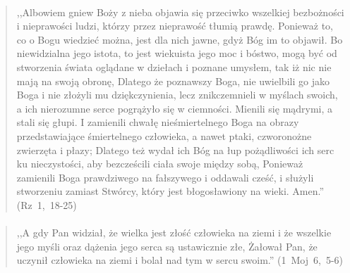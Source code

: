 \documentclass[10pt,a4paper,oneside]{article}
\begin{document}
\paragraph{}
\begin{quote}
,,Albowiem gniew Boży z nieba objawia się przeciwko wszelkiej bezbożności i nieprawości ludzi, którzy przez nieprawość tłumią prawdę. Ponieważ to, co o Bogu wiedzieć można, jest dla nich jawne, gdyż Bóg im to objawił. Bo niewidzialna jego istota, to jest wiekuista jego moc i bóstwo, mogą być od stworzenia świata oglądane w dziełach i poznane umysłem, tak iż nic nie mają na swoją obronę, Dlatego że poznawszy Boga, nie uwielbili go jako Boga i nie złożyli mu dziękczynienia, lecz znikczemnieli w myślach swoich, a ich nierozumne serce pogrążyło się w ciemności. Mienili się mądrymi, a stali się głupi. I zamienili chwałę nieśmiertelnego Boga na obrazy przedstawiające śmiertelnego człowieka, a nawet ptaki, czworonożne zwierzęta i płazy; Dlatego też wydał ich Bóg na łup pożądliwości ich serc ku nieczystości, aby bezcześcili ciała swoje między sobą, Ponieważ zamienili Boga prawdziwego na fałszywego i oddawali cześć, i służyli stworzeniu zamiast Stwórcy, który jest błogosławiony na wieki. Amen.'' \mbox{(Rz 1, 18-25)}
\end{quote}
\paragraph{}
\begin{quote}
,,A gdy Pan widział, że wielka jest złość człowieka na ziemi i że wszelkie jego myśli oraz dążenia jego serca są ustawicznie złe, Żałował Pan, że uczynił człowieka na ziemi i bolał nad tym w sercu swoim.'' \mbox{(1 Moj 6, 5-6)}
\end{quote}
\end{document}
